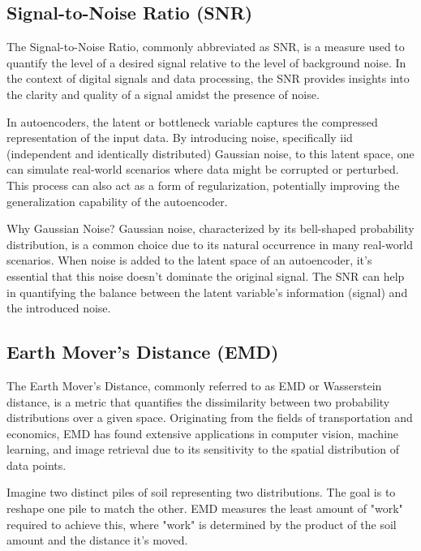 \documentclass{article}
\begin{document}
\subsection{Signal-to-Noise Ratio (SNR)}
\label{ssec:snr}

The Signal-to-Noise Ratio, commonly abbreviated as SNR, is a measure used to quantify the level of a desired signal relative to the level of background noise. 
In the context of digital signals and data processing, the SNR \cite{vincent2008extracting} provides insights into the clarity and quality of a signal amidst the presence of noise.

In autoencoders, the latent or bottleneck variable captures the compressed representation of the input data. By introducing noise, specifically iid (independent and identically distributed) Gaussian noise, to this latent space, one can simulate real-world scenarios where data might be corrupted or perturbed. This process can also act as a form of regularization, potentially improving the generalization capability of the autoencoder.

Why Gaussian Noise? 
Gaussian noise, characterized by its bell-shaped probability distribution, is a common choice due to its natural occurrence in many real-world scenarios. When noise is added to the latent space of an autoencoder, it's essential that this noise doesn't dominate the original signal. The SNR can help in quantifying the balance between the latent variable's information (signal) and the introduced noise.

\subsection{Earth Mover's Distance (EMD)}
\label{ssec:emd}

The Earth Mover's Distance, commonly referred to as EMD or Wasserstein distance\cite{tolstikhin2017wasserstein}, is a metric that quantifies the dissimilarity between two probability distributions over a given space. Originating from the fields of transportation and economics, EMD has found extensive applications in computer vision, machine learning, and image retrieval due to its sensitivity to the spatial distribution of data points.

Imagine two distinct piles of soil representing two distributions. The goal is to reshape one pile to match the other. EMD measures the least amount of "work" required to achieve this, where "work" is determined by the product of the soil amount and the distance it's moved.
\end{document}
